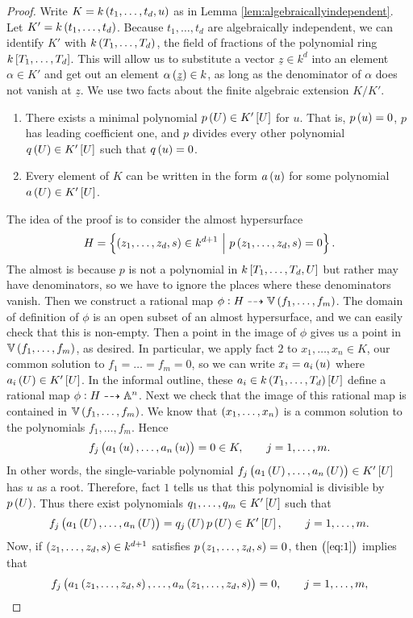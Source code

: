 \begin{proof}
Write $ K = k\br{t_1, \dots, t_d, u} $ as in Lemma \ref{lem:algebraicallyindependent}. Let $ K' = k\br{t_1, \dots, t_d} $. Because $ t_1, \dots, t_d $ are algebraically independent, we can identify $ K' $ with $ k\br{T_1, \dots, T_d} $, the field of fractions of the polynomial ring $ k\sbr{T_1, \dots, T_d} $. This will allow us to substitute a vector $ \underline{z} \in k^d $ into an element $ \alpha \in K' $ and get out an element $ \alpha\br{\underline{z}} \in k $, as long as the denominator of $ \alpha $ does not vanish at $ \underline{z} $. We use two facts about the finite algebraic extension $ K / K' $.
\begin{enumerate}[leftmargin=0.5in, label=Fact \arabic*.]
\item There exists a minimal polynomial $ p\br{U} \in K'\sbr{U} $ for $ u $. That is, $ p\br{u} = 0 $, $ p $ has leading coefficient one, and $ p $ divides every other polynomial $ q\br{U} \in K'\sbr{U} $ such that $ q\br{u} = 0 $.
\item Every element of $ K $ can be written in the form $ a\br{u} $ for some polynomial $ a\br{U} \in K'\sbr{U} $.
\end{enumerate}
The idea of the proof is to consider the almost hypersurface
$$ H = \cbr{\br{z_1, \dots, z_d, s} \in k^{d + 1} \st p\br{z_1, \dots, z_d, s} = 0}. $$
The almost is because $ p $ is not a polynomial in $ k\sbr{T_1, \dots, T_d, U} $ but rather may have denominators, so we have to ignore the places where these denominators vanish. Then we construct a rational map $ \phi : H \dashrightarrow \VV\br{f_1, \dots, f_m} $. The domain of definition of $ \phi $ is an open subset of an almost hypersurface, and we can easily check that this is non-empty. Then a point in the image of $ \phi $ gives us a point in $ \VV\br{f_1, \dots, f_m} $, as desired. In particular, we apply fact $ 2 $ to $ x_1, \dots, x_n \in K $, our common solution to $ f_1 = \dots = f_m = 0 $, so we can write $ x_i = a_i\br{u} $ where $ a_i\br{U} \in K'\sbr{U} $. In the informal outline, these $ a_i \in k\br{T_1, \dots, T_d}\sbr{U} $ define a rational map $ \phi : H \dashrightarrow \AA^n $. Next we check that the image of this rational map is contained in $ \VV\br{f_1, \dots, f_m} $. We know that $ \br{x_1, \dots, x_n} $ is a common solution to the polynomials $ f_1, \dots, f_m $. Hence
$$ f_j\br{a_1\br{u}, \dots, a_n\br{u}} = 0 \in K, \qquad j = 1, \dots, m. $$
In other words, the single-variable polynomial $ f_j\br{a_1\br{U}, \dots, a_n\br{U}} \in K'\sbr{U} $ has $ u $ as a root. Therefore, fact $ 1 $ tells us that this polynomial is divisible by $ p\br{U} $. Thus there exist polynomials $ q_1, \dots, q_m \in K'\sbr{U} $ such that
\begin{equation}
\label{eq:1}
f_j\br{a_1\br{U}, \dots, a_n\br{U}} = q_j\br{U}p\br{U} \in K'\sbr{U}, \qquad j = 1, \dots, m.
\end{equation}
Now, if $ \br{z_1, \dots, z_d, s} \in k^{d + 1} $ satisfies $ p\br{z_1, \dots, z_d, s} = 0 $, then $ \br{\ref{eq:1}} $ implies that
$$ f_j\br{a_1\br{z_1, \dots, z_d, s}, \dots, a_n\br{z_1, \dots, z_d, s}} = 0, \qquad j = 1, \dots, m, $$


\end{proof}
